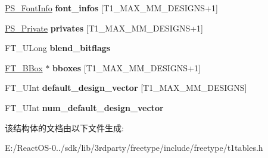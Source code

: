 \begin{DoxyCompactItemize}
\mbox{\label{struct_p_s___blend_rec___ac5478cafc838257e693a9604edf1f5e9}} 
\hyperlink{struct_p_s___font_info_rec__}{P\+S\+\_\+\+Font\+Info} {\bfseries font\+\_\+infos} \mbox{[}T1\+\_\+\+M\+A\+X\+\_\+\+M\+M\+\_\+\+D\+E\+S\+I\+G\+NS+1\mbox{]}
\item 
\mbox{\label{struct_p_s___blend_rec___a2b6e0c48d7a9c350b09f2943c1779ea4}} 
\hyperlink{struct_p_s___private_rec__}{P\+S\+\_\+\+Private} {\bfseries privates} \mbox{[}T1\+\_\+\+M\+A\+X\+\_\+\+M\+M\+\_\+\+D\+E\+S\+I\+G\+NS+1\mbox{]}
\item 
\mbox{\label{struct_p_s___blend_rec___a86caa5319e208b4a2057db656bad9221}} 
F\+T\+\_\+\+U\+Long {\bfseries blend\+\_\+bitflags}
\item 
\mbox{\label{struct_p_s___blend_rec___a30845d3cbd2e95a5f9cc867c7226af5e}} 
\hyperlink{struct_f_t___b_box__}{F\+T\+\_\+\+B\+Box} $\ast$ {\bfseries bboxes} \mbox{[}T1\+\_\+\+M\+A\+X\+\_\+\+M\+M\+\_\+\+D\+E\+S\+I\+G\+NS+1\mbox{]}
\item 
\mbox{\label{struct_p_s___blend_rec___a3ddacbda91fe0f9ef934a9e0afa6286f}} 
F\+T\+\_\+\+U\+Int {\bfseries default\+\_\+design\+\_\+vector} \mbox{[}T1\+\_\+\+M\+A\+X\+\_\+\+M\+M\+\_\+\+D\+E\+S\+I\+G\+NS\mbox{]}
\item 
\mbox{\label{struct_p_s___blend_rec___afa5c7dd4206eb8a1d9ef4894abfc9555}} 
F\+T\+\_\+\+U\+Int {\bfseries num\+\_\+default\+\_\+design\+\_\+vector}
\end{DoxyCompactItemize}


该结构体的文档由以下文件生成\+:\begin{DoxyCompactItemize}
\item 
E\+:/\+React\+O\+S-\/0../sdk/lib/3rdparty/freetype/include/freetype/t1tables.\+h\end{DoxyCompactItemize}
